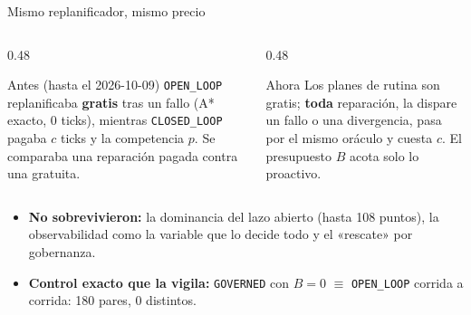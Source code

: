 \documentclass[aspectratio=169]{beamer}
\newcommand{\pol}[1]{\texttt{#1}}
\newcommand{\OL}{\pol{OPEN\_LOOP}}
\newcommand{\CL}{\pol{CLOSED\_LOOP}}
\newcommand{\GOV}{\pol{GOVERNED}}
\begin{document}
\begin{frame}{Mismo replanificador, mismo precio}
  \begin{columns}[T]
    \begin{column}{0.48\textwidth}
      \begin{alertblock}{Antes (hasta el 2026-10-09)}
        \small \OL{} replanificaba \textbf{gratis} tras un fallo (A* exacto,
        0 ticks), mientras \CL{} pagaba $c$ ticks y la competencia $p$.
        Se comparaba una reparación pagada contra una gratuita.
      \end{alertblock}
    \end{column}
    \begin{column}{0.48\textwidth}
      \begin{exampleblock}{Ahora}
        \small Los planes de rutina son gratis; \textbf{toda} reparación, la
        dispare un fallo o una divergencia, pasa por el mismo oráculo y cuesta
        $c$. El presupuesto $B$ acota solo lo proactivo.
      \end{exampleblock}
    \end{column}
  \end{columns}
  \vspace{0.6em}
  \small
  \begin{itemize}
    \item \textbf{No sobrevivieron:} la dominancia del lazo abierto (hasta 108
      puntos), la observabilidad como la variable que lo decide todo y el
      «rescate» por gobernanza.
    \item \textbf{Control exacto que la vigila:} \GOV{} con $B=0$ $\equiv$
      \OL{} corrida a corrida: 180 pares, 0 distintos.
  \end{itemize}
\end{frame}
\end{document}
